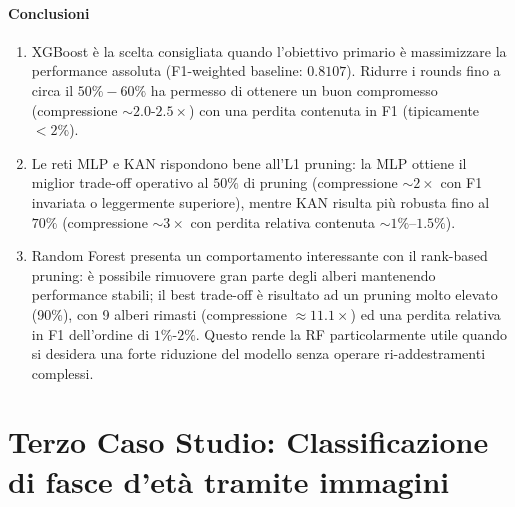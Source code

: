 \documentclass[a4paper,12pt]{report}
\begin{document}
	\subsubsection{Conclusioni}
	\begin{enumerate}
		\item XGBoost è la scelta consigliata quando l'obiettivo primario è massimizzare la performance assoluta (F1-weighted baseline: $0.8107$). Ridurre i rounds fino a circa il $50\%-60\%$ ha permesso di ottenere un buon compromesso (compressione $\sim 2.0$-$2.5\times$) con una perdita contenuta in F1 (tipicamente $<2\%$).
		\item Le reti MLP e KAN rispondono bene all'L1 pruning: la MLP ottiene il miglior trade-off operativo al $50\%$ di pruning (compressione $\sim 2\times$ con F1 invariata o leggermente superiore), mentre KAN risulta più robusta fino al $70\%$ (compressione $\sim 3\times$ con perdita relativa contenuta $\sim 1\%$--$1.5\%$).
		\item Random Forest presenta un comportamento interessante con il rank-based pruning: è possibile rimuovere gran parte degli alberi mantenendo performance stabili; il best trade-off è risultato ad un pruning molto elevato (90\%), con 9 alberi rimasti (compressione $\approx 11.1\times$) ed una perdita relativa in F1 dell'ordine di $1\%$-$2\%$. Questo rende la RF particolarmente utile quando si desidera una forte riduzione del modello senza operare ri-addestramenti complessi.
	\end{enumerate}
	
	\chapter{Terzo Caso Studio: Classificazione di fasce d'età tramite immagini}
	
\end{document}
